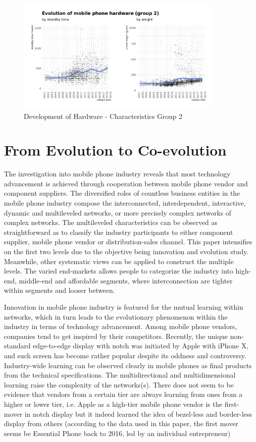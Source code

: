 \documentclass[utf8,english]{gradu3}
\begin{document}
\begin{figure}[htb]
    \centering
    \includegraphics[width=0.90\textwidth]{evo2.png}
    \caption{Development of Hardware - Characteristics Group 2}
    \label{fig:standby}
\end{figure}

\section{From Evolution to Co-evolution}

The investigation into mobile phone industry reveals that most technology advancement is achieved through cooperation between mobile phone vendor and component suppliers. The diversified roles of countless business entities in the mobile phone industry compose the interconnected, interdependent, interactive, dynamic and multileveled networks, or more precisely complex networks of complex networks. The multileveled characteristics can be observed as straightforward as to classify the industry participants to either component supplier, mobile phone vendor or distribution-sales channel. This paper intensifies on the first two levels due to the objective being innovation and evolution study. Meanwhile, other systematic views can be applied to construct the multiple levels. The varied end-markets allows people to categorize the industry into high-end, middle-end and affordable segments, where interconnection are tighter within segments and looser between.

Innovation in mobile phone industry is featured for the mutual learning within networks, which in turn leads to the evolutionary phenomenon within the industry in terms of technology advancement. Among mobile phone vendors, companies tend to get inspired by their competitors. Recently, the unique non-standard edge-to-edge display with notch was initiated by Apple with iPhone X, and such screen has become rather popular despite its oddness and controversy. Industry-wide learning can be observed clearly in mobile phones as final products from the technical specifications. The multidirectional and multidimensional learning raise the complexity of the networks(s). There does not seem to be evidence that vendors from a certain tier are always learning from ones from a higher or lower tier, i.e. Apple as a high-tier mobile phone vendor is the first-mover in notch display but it indeed learned the idea of bezel-less and border-less display from others (according to the data used in this paper, the first mover seems be Essential Phone back to 2016, led by an individual entrepreneur)
\end{document}
